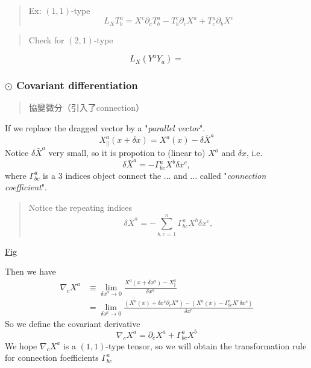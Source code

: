 \begin{quote}
	Ex: $(1,1)$-type
\begin{equation}
L_{X}T^{a}_{b} = X^{c}\partial_c T^{a}_{b} - T^{c}_{b}\partial_{c}X^{a} + T^{a}_{c}\partial_{b}X^{c}
\end{equation}

\end{quote}
\begin{quote}
	Check for $(2,1)$-type
\end{quote}


\begin{equation}
L_X(Y^{a}Y_{a})=
\end{equation}

\subsubsection{$\odot$ Covariant differentiation} %

\begin{quote}
	協變微分（引入了connection）
\end{quote}

If we replace the dragged vector by a "\textit{parallel vector}".
\begin{equation}
X^{a}_{\parallel}(x+\delta x) = X^{a}(x) - \delta \bar{X}^{a}
\end{equation}
Notice $\delta \bar{X}^{a}$ very small, so it is propotion to (linear to) $X^{a}$ and $\delta x$, i.e.
\begin{equation}
\delta \bar{X}^{a} = -\Gamma^{a}_{bc} X^{b}\delta x^{c},
\end{equation}
where $\Gamma^{a}_{bc}$ is a 3 indices object connect the ... and ... called "\textit{connection coefficient}".

\begin{quote}
	Notice the repeating indices
\begin{equation}
\delta \bar{X}^{a} = -\sum_{b,c=1}^{n}\Gamma^{a}_{bc} X^{b}\delta x^{c},
\end{equation}

\end{quote}
\underline{Fig}

Then we have
\begin{equation}
\begin{aligned}
\nabla_{c}X^{a} &\equiv \lim_{\delta x^{a}\to 0} \frac{X^{a}(x+\delta x^{a}) - X^{a}_{\parallel}}{\delta x^{a}}\\
&= \lim_{\delta x^{c}\to 0} \frac{\left(X^{a}(x)+\delta x^{c}\partial_c X^{a}\right)-\left(X^{a}(x)-\Gamma^{a}_{bc}X^{v}\delta x^{c}\right)}{\delta x^{c}}
\end{aligned}
\end{equation}
So we define the covariant derivative 
\begin{equation}
\nabla_{c} X^{a} = \partial_{c}X^{a} + \Gamma^{a}_{bc} X^{b}
\end{equation}
We hope $\nabla_c X^{a}$ is a $(1,1)$-type tensor, so we will obtain the transformation rule for connection foefficients $\Gamma^{a}_{bc}$

